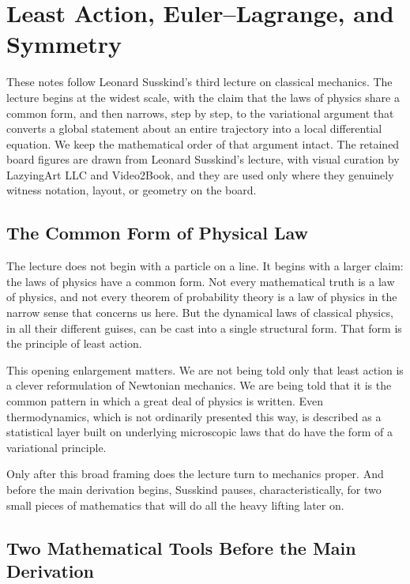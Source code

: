 \chapter{Least Action, Euler--Lagrange, and Symmetry}

These notes follow Leonard Susskind's third lecture on classical mechanics. The lecture begins at the widest scale, with the claim that the laws of physics share a common form, and then narrows, step by step, to the variational argument that converts a global statement about an entire trajectory into a local differential equation. We keep the mathematical order of that argument intact. The retained board figures are drawn from Leonard Susskind's lecture, with visual curation by LazyingArt LLC and Video2Book, and they are used only where they genuinely witness notation, layout, or geometry on the board.

\section{The Common Form of Physical Law}

The lecture does not begin with a particle on a line. It begins with a larger claim: the laws of physics have a common form. Not every mathematical truth is a law of physics, and not every theorem of probability theory is a law of physics in the narrow sense that concerns us here. But the dynamical laws of classical physics, in all their different guises, can be cast into a single structural form. That form is the principle of least action.

This opening enlargement matters. We are not being told only that least action is a clever reformulation of Newtonian mechanics. We are being told that it is the common pattern in which a great deal of physics is written. Even thermodynamics, which is not ordinarily presented this way, is described as a statistical layer built on underlying microscopic laws that do have the form of a variational principle.

Only after this broad framing does the lecture turn to mechanics proper. And before the main derivation begins, Susskind pauses, characteristically, for two small pieces of mathematics that will do all the heavy lifting later on.

\section{Two Mathematical Tools Before the Main Derivation}

